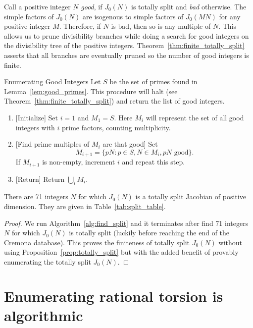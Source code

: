 \documentclass[11pt, proquest]{uwthesis}
\begin{document}
Call a positive integer $N$ \emph{good}, if $J_0(N)$ is totally split and
\emph{bad} otherwise. The simple factors of $J_0(N)$ are isogenous to simple
factors of $J_0(MN)$ for any positive integer $M$. Therefore, if $N$ is bad,
then so is any multiple of $N$. This allows us to prune divisibility branches
while doing a search for good integers on the divisibility tree of the positive
integers. Theorem~\ref{thm:finite_totally_split} asserts that all branches are
eventually pruned so the number of good integers is finite.

\begin{algorithm}{Enumerating Good Integers}
    \label{alg:find_split}
    Let $S$ be the set of primes found in Lemma~\ref{lem:good_primes}. This
    procedure will halt (see Theorem~\ref{thm:finite_totally_split}) and return
    the list of good integers.
\end{algorithm}
\begin{enumerate}
    \item{} [Initialize]
        \label{step:initialize}
        Set $i=1$ and $M_1=S$. Here $M_i$ will represent the set of all good
        integers with $i$ prime factors, counting multiplicity.
    \item{} [Find prime multiples of $M_i$ are that good]
        Set
        \[
            M_{i+1}=\{pN: p\in S, N\in M_i, pN \text{ good}\}.
        \]
        If $M_{i+1}$ is non-empty, increment $i$ and repeat this step.
    \item{} [Return]
        Return $\bigcup_i M_i$.
\end{enumerate}
\begin{theorem}
    \label{thm:finite_totally_split}
    There are 71 integers $N$ for which $J_0(N)$ is a totally split Jacobian of
    positive dimension. They are given in Table~\ref{tab:split_table}.
\end{theorem}
\begin{proof}
    We run Algorithm~\ref{alg:find_split} and it terminates after find 71
    integers $N$ for which $J_0(N)$ is totally split (luckily before reaching
    the end of the Cremona database). This proves the finiteness of totally
    split $J_0(N)$ without using Proposition~\ref{prop:totally_split} but with
    the added benefit of provably enumerating the totally split $J_0(N)$.
\end{proof}


\section{Enumerating rational torsion is algorithmic}
\end{document}
